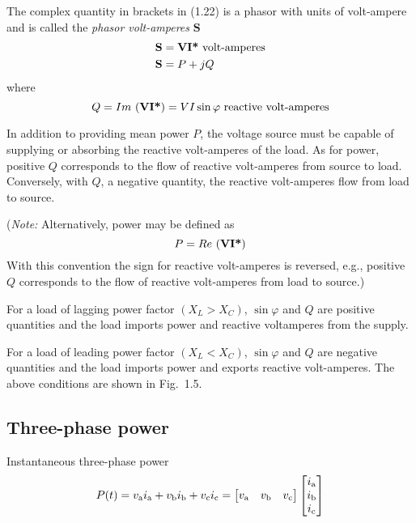 \documentclass[a4paper,numbers=noenddot,12pt]{scrbook}
\begin{document}
The complex quantity in brackets in (1.22) is a phasor with units of volt-ampere and is called the \textit{phasor volt-amperes} $\mathbf{S}$
\begin{align}
    \mathbf{S} & = \mathbf{V} \mathbf{I}\text{\bfseries*}\ \text{volt-amperes} \nonumber \\
    \mathbf{S} & = P + jQ
    \label{eq:Eq1.23}
\end{align}
where
\begin{equation}
    Q = Im\ (\mathbf{V}\mathbf{I \text{\bfseries *}}) = V I \sin \varphi\ \text{reactive volt-amperes}
    \label{eq:Eq1.24}
\end{equation}

In addition to providing mean power $P$, the voltage source must be capable of supplying or absorbing the reactive volt-amperes of the load. As for power, positive $Q$ corresponds to the flow of reactive volt-amperes from source to load. Conversely, with $Q$, a negative quantity, the reactive volt-amperes flow from load to source. 

\noindent(\textit{Note:} Alternatively, power may be defined as 
\begin{equation*}
    P = Re\ (\mathbf{V}\mathbf{I}\text{\bfseries *})
\end{equation*}
With this convention the sign for reactive volt-amperes is reversed, e.g., positive $Q$ corresponds to the flow of reactive volt-amperes from load to source.)

For a load of lagging power factor $(X_L > X_C)$, $\sin \varphi$ and $Q$ are positive quantities and the load imports power and reactive volt­amperes from the supply.

For a load of leading power factor $(X_L < X_C)$, $\sin \varphi$ and $Q$ are negative quantities and the load imports power and exports reactive volt-amperes.
The above conditions are shown in Fig.\ 1.5. 
\subsection{Three-phase power} Instantaneous three-phase power
\begin{equation}
    P(t) = v_\textup{a} i_\textup{a} + v_\textup{b} i_\textup{b} + v_\textup{c} i_\textup{c} =
    \begin{bmatrix}
        v_\textup{a} & v_\textup{b} & v_\textup{c}
    \end{bmatrix}
    \begin{bmatrix}
        i_\textup{a} \\ i_\textup{b} \\ i_\textup{c}
    \end{bmatrix}
    \label{eq:Eq1.25}
\end{equation}
\end{document}
